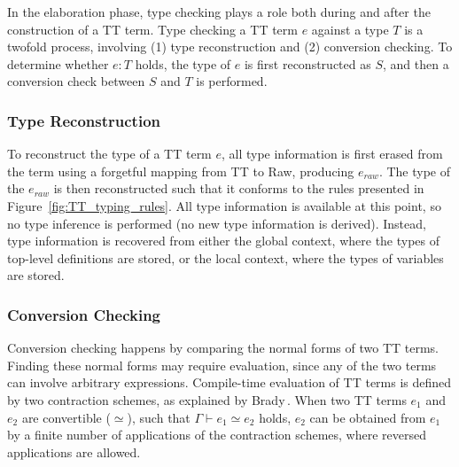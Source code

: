 
In the elaboration phase, type checking plays a role both during and after the
construction of a TT term. Type checking a TT term $e$ against a type $T$ is a
twofold process, involving (1) type reconstruction and (2) conversion
checking. To determine whether $e : T$ holds, the type of $e$ is first
reconstructed as $S$, and then a conversion check between $S$ and $T$ is performed.

\subsubsection{Type Reconstruction}
To reconstruct the type of a TT term $e$, all type information is first erased from
the term using a forgetful mapping from TT to Raw, producing $e_{raw}$. The type of the $e_{raw}$ is
then reconstructed such that it conforms to the rules presented in
Figure~\ref{fig:TT_typing_rules}. All type information is available at this
point, so no type inference is performed (no new type information is
derived). Instead, type information is recovered from either the global context,
where the types of top-level definitions are stored, or the local context, where
the types of variables are stored.

\subsubsection{Conversion Checking}
Conversion checking happens by comparing the normal forms of two TT
terms. Finding these normal forms may require evaluation, since any of the two
terms can involve arbitrary expressions. Compile-time evaluation of TT terms is
defined by two contraction schemes, as explained by Brady\,\citep{BradyIdrisImpl13}.
When two TT terms $e_{1}$ and $e_{2}$ are convertible ($\simeq$), such that
$\Gamma\vdash e_{1} \simeq e_{2}$ holds, $e_{2}$ can be
obtained from $e_{1}$ by a finite number of applications of the contraction
schemes, where reversed applications are allowed.

